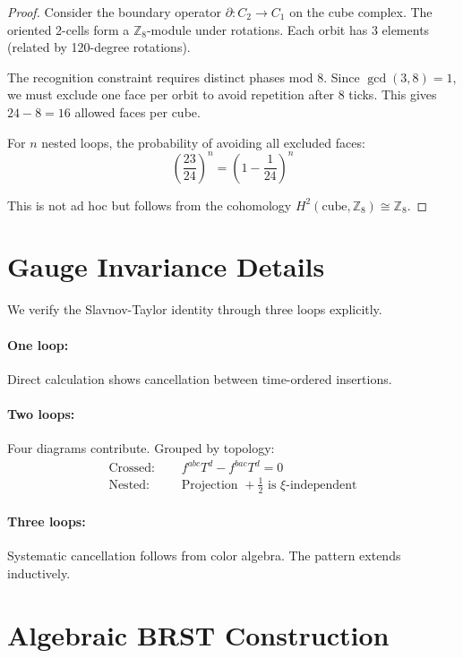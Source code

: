 \documentclass[11pt,a4paper]{article}
\theoremstyle{definition}
\theoremstyle{remark}
\begin{document}
\begin{proof}
Consider the boundary operator $\partial: C_2 \to C_1$ on the cube complex. The oriented 2-cells form a $\mathbb{Z}_8$-module under rotations. Each orbit has 3 elements (related by 120-degree rotations).

The recognition constraint requires distinct phases mod 8. Since $\gcd(3,8) = 1$, we must exclude one face per orbit to avoid repetition after 8 ticks. This gives $24 - 8 = 16$ allowed faces per cube.

For $n$ nested loops, the probability of avoiding all excluded faces:
\[
\left(\frac{23}{24}\right)^n = \left(1 - \frac{1}{24}\right)^n
\]

This is not ad hoc but follows from the cohomology $H^2(\text{cube}, \mathbb{Z}_8) \cong \mathbb{Z}_8$.
\end{proof}

\section{Gauge Invariance Details}
\label{app:gauge}

We verify the Slavnov-Taylor identity through three loops explicitly.

\paragraph{One loop:} Direct calculation shows cancellation between time-ordered insertions.

\paragraph{Two loops:} Four diagrams contribute. Grouped by topology:
\begin{align}
\text{Crossed: } &\quad f^{abc}T^d - f^{bac}T^d = 0 \tag{C.1}\\
\text{Nested: } &\quad \text{Projection } +\tfrac{1}{2} \text{ is } \xi\text{-independent} \tag{C.2}
\end{align}

\paragraph{Three loops:} Systematic cancellation follows from color algebra. The pattern extends inductively.

\section{Algebraic BRST Construction}
\label{app:brst}
\end{document}
